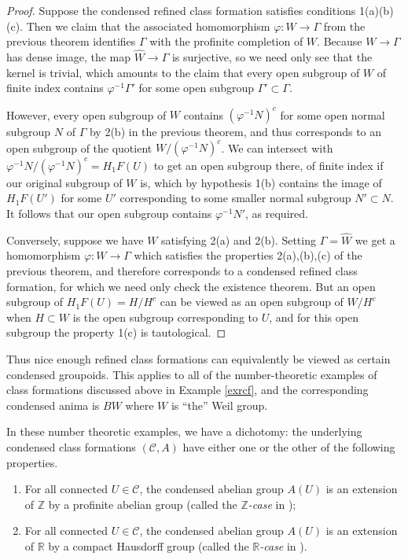 \documentclass[12pt]{article}
\theoremstyle{definition}
\newcommand{\mc}{\mathcal}
\newcommand{\mbb}{\mathbb}
\newcommand{\wh}{\widehat}
\begin{document}
\begin{proof}
Suppose the condensed refined class formation satisfies conditions 1(a)(b)(c).  Then we claim that the associated homomorphism $\varphi:W\to\Gamma$ from the previous theorem identifies $\Gamma$ with the profinite completion of $W$.  Because $W\to \Gamma$ has dense image, the map $\wh{W}\to\Gamma$ is surjective, so we need only see that the kernel is trivial, which amounts to the claim that every open subgroup of $W$ of finite index contains $\varphi^{-1}\Gamma'$ for some open subgroup $\Gamma'\subset \Gamma$.

However, every open subgroup of $W$ contains $(\varphi^{-1}N)^c$ for some open normal subgroup $N$ of $\Gamma$ by 2(b) in the previous theorem, and thus corresponds to an open subgroup of the quotient $W/(\varphi^{-1}N)^c$.  We can intersect with $\varphi^{-1}N/(\varphi^{-1}N)^c = H_1F(U)$ to get an open subgroup there, of finite index if our original subgroup of $W$ is, which by hypothesis 1(b) contains the image of $H_1F(U')$ for some $U'$ corresponding to some smaller normal subgroup $N'\subset N$.  It follows that our open subgroup contains $\varphi^{-1}N'$, as required.

Conversely, suppose we have $W$ satisfying 2(a) and 2(b).  Setting $\Gamma=\widehat{W}$ we get a homomorphism $\varphi:W \to \Gamma$ which satisfies the properties 2(a),(b),(c) of the previous theorem, and therefore corresponds to a condensed refined class formation, for which we need only check the existence theorem.  But an open subgroup of $H_1F(U) = H/H^c$ can be viewed as an open subgroup of $W/H^c$ when $H\subset W$ is the open subgroup corresponding to $U$, and for this open subgroup the property 1(c) is tautological.
\end{proof}

Thus nice enough refined class formations can equivalently be viewed as certain condensed groupoids.  This applies to all of the number-theoretic examples of class formations discussed above in Example \ref{exrcf}, and the corresponding condensed anima is $BW$ where $W$ is ``the'' Weil group.

In these number theoretic examples, we have a dichotomy: the underlying condensed class formations $(\mc{C},A)$ have either one or the other of the following properties.

\begin{enumerate}
\item For all connected $U\in\mc{C}$, the condensed abelian group $A(U)$ is an extension of $\mbb{Z}$ by a profinite abelian group (called the \emph{$\mbb{Z}$-case} in \cite{tatentb});
\item For all connected $U\in\mc{C}$, the condensed abelian group $A(U)$ is an extension of $\mbb{R}$ by a compact Hausdorff group (called the \emph{$\mbb{R}$-case} in \cite{tatentb}).
\end{enumerate}
\end{document}
